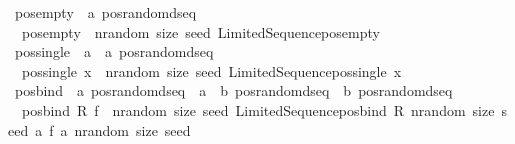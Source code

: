 \begin{isabellebody}
\isanewline
{}\isamarkupfalse%
\ pos{\isacharunderscore}{\kern0pt}empty\ {\isacharcolon}{\kern0pt}{\isacharcolon}{\kern0pt}\ {\isachardoublequoteopen}{\isacharprime}{\kern0pt}a\ pos{\isacharunderscore}{\kern0pt}random{\isacharunderscore}{\kern0pt}dseq{\isachardoublequoteclose}\isanewline
{}\isanewline
\ \ {\isachardoublequoteopen}pos{\isacharunderscore}{\kern0pt}empty\ {\isacharequal}{\kern0pt}\ {\isacharparenleft}{\kern0pt}{\isacharpercent}{\kern0pt}nrandom\ size\ seed{\isachardot}{\kern0pt}\ Limited{\isacharunderscore}{\kern0pt}Sequence{\isachardot}{\kern0pt}pos{\isacharunderscore}{\kern0pt}empty{\isacharparenright}{\kern0pt}{\isachardoublequoteclose}\isanewline
\isanewline
{}\isamarkupfalse%
\ pos{\isacharunderscore}{\kern0pt}single\ {\isacharcolon}{\kern0pt}{\isacharcolon}{\kern0pt}\ {\isachardoublequoteopen}{\isacharprime}{\kern0pt}a\ {\isacharequal}{\kern0pt}{\isachargreater}{\kern0pt}\ {\isacharprime}{\kern0pt}a\ pos{\isacharunderscore}{\kern0pt}random{\isacharunderscore}{\kern0pt}dseq{\isachardoublequoteclose}\isanewline
{}\isanewline
\ \ {\isachardoublequoteopen}pos{\isacharunderscore}{\kern0pt}single\ x\ {\isacharequal}{\kern0pt}\ {\isacharparenleft}{\kern0pt}{\isacharpercent}{\kern0pt}nrandom\ size\ seed{\isachardot}{\kern0pt}\ Limited{\isacharunderscore}{\kern0pt}Sequence{\isachardot}{\kern0pt}pos{\isacharunderscore}{\kern0pt}single\ x{\isacharparenright}{\kern0pt}{\isachardoublequoteclose}\isanewline
\isanewline
{}\isamarkupfalse%
\ pos{\isacharunderscore}{\kern0pt}bind\ {\isacharcolon}{\kern0pt}{\isacharcolon}{\kern0pt}\ {\isachardoublequoteopen}{\isacharprime}{\kern0pt}a\ pos{\isacharunderscore}{\kern0pt}random{\isacharunderscore}{\kern0pt}dseq\ {\isacharequal}{\kern0pt}{\isachargreater}{\kern0pt}\ {\isacharparenleft}{\kern0pt}{\isacharprime}{\kern0pt}a\ {\isasymRightarrow}\ {\isacharprime}{\kern0pt}b\ pos{\isacharunderscore}{\kern0pt}random{\isacharunderscore}{\kern0pt}dseq{\isacharparenright}{\kern0pt}\ {\isasymRightarrow}\ {\isacharprime}{\kern0pt}b\ pos{\isacharunderscore}{\kern0pt}random{\isacharunderscore}{\kern0pt}dseq{\isachardoublequoteclose}\isanewline
{}\isanewline
\ \ {\isachardoublequoteopen}pos{\isacharunderscore}{\kern0pt}bind\ R\ f\ {\isacharequal}{\kern0pt}\ {\isacharparenleft}{\kern0pt}{\isasymlambda}nrandom\ size\ seed{\isachardot}{\kern0pt}\ Limited{\isacharunderscore}{\kern0pt}Sequence{\isachardot}{\kern0pt}pos{\isacharunderscore}{\kern0pt}bind\ {\isacharparenleft}{\kern0pt}R\ nrandom\ size\ seed{\isacharparenright}{\kern0pt}\ {\isacharparenleft}{\kern0pt}{\isacharpercent}{\kern0pt}a{\isachardot}{\kern0pt}\ f\ a\ nrandom\ size\ seed{\isacharparenright}{\kern0pt}{\isacharparenright}{\kern0pt}{\isachardoublequoteclose}\isanewline

\end{isabellebody}

